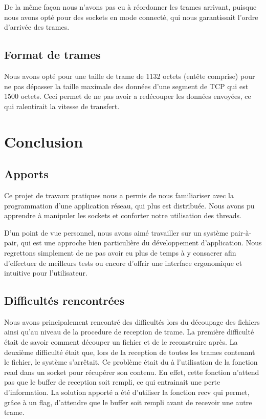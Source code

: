 \documentclass[a4paper, 11pt, french]{report}
\begin{document}
	De la même façon nous n'avons pas eu à réordonner les trames arrivant, puisque nous avons opté pour des sockets en mode connecté, qui nous garantissait l'ordre d'arrivée des trames.

	\section{Format de trames} %
	Nous avons opté pour une taille de trame de 1132 octets (entête comprise) pour ne pas dépasser la taille maximale des données d'une segment de TCP qui est 1500 octets. Ceci permet de ne pas avoir a redécouper les données envoyées, ce qui ralentirait la vitesse de transfert.
	

\chapter{Conclusion}
	\section{Apports} %
	Ce projet de travaux pratiques nous a permis de nous familiariser avec la programmation d'une application réseau, qui plus est distribuée. Nous avons pu apprendre à manipuler les sockets et conforter notre utilisation des threads.
	\newline

	D'un point de vue personnel, nous avons aimé travailler sur un système pair-à-pair, qui est une approche bien particulière du développement d'application. Nous regrettons simplement de ne pas avoir eu plus de temps à y consacrer afin d'effectuer de meilleurs tests ou encore d'offrir une interface ergonomique et intuitive pour l'utilisateur.


	\section{Difficultés rencontrées} %
	Nous avons principalement rencontré des difficultés lors du découpage des fichiers ainsi qu'au niveau de la procedure de reception de trame. 
	La première difficulté était de savoir comment découper un fichier et de le reconstruire après.
	La deuxième difficulté était que, lors de la reception de toutes les trames contenant le fichier, le système s'arrêtait. Ce problème était du à l'utilisation de la fonction read dans un socket pour récupérer son contenu. En effet, cette fonction n'attend pas que le buffer de reception soit rempli, ce qui entrainait une perte d'information. La solution apporté a été d'utiliser la fonction recv qui permet, grâce à un flag, d'attendre que le buffer soit rempli avant de recevoir une autre trame. 
\end{document}
